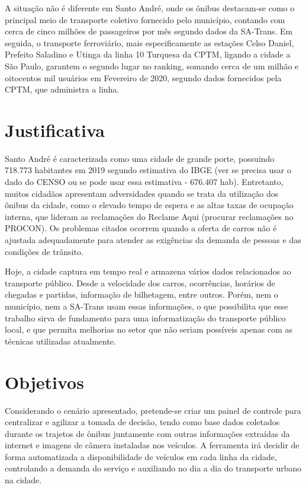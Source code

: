 \par A situação não é diferente em Santo André, onde os ônibus destacam-se como o principal meio de transporte coletivo fornecido pelo município, contando com cerca de cinco milhões de passageiros por mês segundo dados da SA-Trans. Em seguida, o transporte ferroviário, mais especificamente as estações Celso Daniel, Prefeito Saladino e Utinga da linha 10 Turquesa da CPTM, ligando a cidade a São Paulo, garantem o segundo lugar no ranking, somando cerca de um milhão e oitocentos mil usuários em Fevereiro de 2020, segundo dados fornecidos pela CPTM, que administra a linha.

\section{Justificativa}
\indent
\par Santo André é caracterizada como uma cidade de grande porte, possuindo 718.773 habitantes em 2019 segundo estimativa do IBGE (ver se precisa usar o dado do CENSO ou se pode usar essa estimativa - 676.407 hab). Entretanto, muitos cidadãos apresentam adversidades quando se trata da utilização dos ônibus da cidade, como o elevado tempo de espera e as altas taxas de ocupação interna, que lideram as reclamações do Reclame Aqui (procurar reclamações no PROCON). Os problemas citados ocorrem quando a oferta de carros não é ajustada adequadamente para atender as exigências da demanda de pessoas e das condições de trânsito.
\par Hoje, a cidade captura em tempo real e armazena vários dados relacionados ao transporte público. Desde a velocidade dos carros, ocorrências, horários de chegadas e partidas, informação de bilhetagem, entre outros. Porém, nem o município, nem a SA-Trans usam essas informações, o que possibilita que esse trabalho sirva de fundamento para uma informatização do transporte público local, e que permita melhorias no setor que não seriam possíveis apenas com as técnicas utilizadas atualmente.



\section{Objetivos}
\indent
\par Considerando o cenário apresentado, pretende-se criar um painel de controle para centralizar e agilizar a tomada de decisão, tendo como base dados coletados durante os trajetos de ônibus juntamente com outras informações extraídas da internet e imagens de câmera instaladas nos veículos. A ferramenta irá decidir de forma automatizada a disponibilidade de veículos em cada linha da cidade, controlando a demanda do serviço e auxiliando no dia a dia do transporte urbano na cidade.

